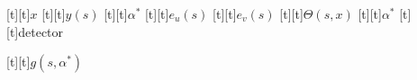 %    
%
%

\begin{psfrags}%
\psfragscanon%
%

[t][t]{$x$}
[t][t]{$y(s)$}
[t][t]{$\alpha^*$}
[t][t]{$e_u(s)$}
[t][t]{$e_v(s)$}
[t][t]{$\Theta(s, x)$}
[t][t]{$\alpha^*$}
[t][t]{detector}

[t][t]{$g(s, \alpha^*)$}
%
%
\end{psfrags}%
%
